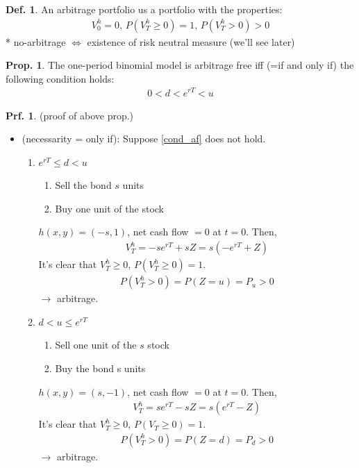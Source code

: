 \documentclass[a4paper,11pt]{jsarticle}
\theoremstyle{definition}
\newtheorem{definition}{Def.}[subsection]
\newtheorem{prf}{Prf.}[subsection]
\newtheorem{prop}{Prop.}[subsection]
\begin{document}
\begin{definition}
  An arbitrage portfolio us a portfolio with the properties:
  \begin{align}
    V_0^h=0, \, P(V_T^h\geq 0)=1, \, P(V_T^h>0)>0
  \end{align}
  * no-arbitrage $\Leftrightarrow$ existence of risk neutral measure
  (we'll see later)
\end{definition}

\begin{prop}\label{prop_af}
  The one-period binomial model is arbitrage free
  iff (=if and only if) the following condition holds:
  \begin{align}\label{cond_af}
    0 < d < e^{rT} <u
  \end{align}

  \begin{prf}{(proof of above prop.)} 
    
    \begin{itemize}
      \item (necessarity = only if):
      Suppose \ref{cond_af} does not hold.
      \begin{enumerate}
        \item $e^{rT}\leq d < u$
        \begin{enumerate}
          \item Sell the bond $s$ units
          \item Buy one unit of the stock
        \end{enumerate}
        $h(x,y)=(-s,1)$, net cash flow $=0$ at $t=0$.
        Then,
        \begin{align}
          V_T^h=-se^{rT}+sZ=s(-e^{rT}+Z)
        \end{align}
        It's clear that $V_T^h \geq 0$, $P(V_T^h\geq 0)=1$.
        \begin{align}
          P(V_T^h>0)=P(Z=u)=P_u>0
        \end{align}
        $\rightarrow$ arbitrage.

        \item $d < u \leq e^{rT}$ \\
        \begin{enumerate}
          \item Sell one unit of the $s$ stock
          \item Buy the bond s units
        \end{enumerate}
        $h(x,y)=(s,-1)$, net cash flow $=0$ at $t=0$.
        Then,
        \begin{align}
          V_T^h=se^{rT}-sZ=s(e^{rT}-Z)
        \end{align}
        It's clear that $V_T^h \geq 0$, $P(V_T\geq 0)=1$.
        \begin{align}
          P(V_T^h>0)=P(Z=d)=P_d>0
        \end{align}
        $\rightarrow$ arbitrage.
      \end{enumerate}


\end{itemize}
\end{prf}
\end{prop}
\end{document}
